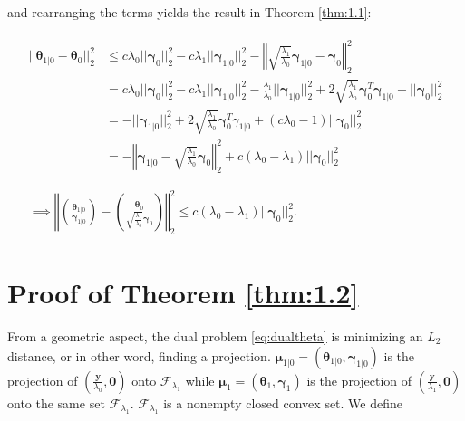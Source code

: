 and rearranging the terms yields the result in Theorem \ref{thm:1.1}:

\begin{gather}
    \begin{aligned}
        ||\boldsymbol\theta_{1|0}-\boldsymbol\theta_{0}||_2^2&\leq c\lambda_0||\boldsymbol\gamma_{0}||_2^2-c\lambda_1||\boldsymbol\gamma_{1|0}||_2^2-\left\Vert\sqrt{\frac{\lambda_1}{\lambda_0}}\boldsymbol\gamma_{1|0}-\boldsymbol\gamma_{0}\right\Vert_2^2\\
        &=c\lambda_0||\boldsymbol\gamma_{0}||_2^2-c\lambda_1||\boldsymbol\gamma_{1|0}||_2^2-\frac{\lambda_1}{\lambda_0}||\boldsymbol\gamma_{1|0}||_2^2+2\sqrt{\frac{\lambda_1}{\lambda_0}}\boldsymbol\gamma_{0}^T\boldsymbol\gamma_{1|0}-||\boldsymbol\gamma_{0}||_2^2\\
        &=-||\boldsymbol\gamma_{1|0}||_2^2+2\sqrt{\frac{\lambda_1}{\lambda_0}}\boldsymbol\gamma_{0}^T\gamma_{1|0}+(c\lambda_0-1)||\boldsymbol\gamma_{0}||_2^2\\
        &=-\left\Vert\boldsymbol\gamma_{1|0}-\sqrt{\frac{\lambda_1}{\lambda_0}}\boldsymbol\gamma_{0}\right\Vert_2^2+c(\lambda_0-\lambda_1)||\boldsymbol\gamma_{0}||_2^2\\
    \end{aligned}\\
    \begin{aligned}
        \implies \left\Vert\binom{\boldsymbol\theta_{1|0}}{\boldsymbol\gamma_{1|0}}-\binom{\boldsymbol\theta_{0}}{\sqrt{\frac{\lambda_1}{\lambda_0}}\boldsymbol\gamma_{0}}\right\Vert_2^2\leq c(\lambda_0-\lambda_1)||\boldsymbol\gamma_{0}||_2^2.\nonumber
    \end{aligned}
\end{gather}

\section{Proof of Theorem \ref{thm:1.2}}

From a geometric aspect, the dual problem \eqref{eq:dualtheta} is minimizing an $L_2$ distance, or in other word, finding a projection. $\boldsymbol\mu_{1|0}=(\boldsymbol \theta_{1|0},\boldsymbol \gamma_{1|0})$ is the projection of $(\frac{\boldsymbol y}{\lambda_0},\boldsymbol0)$ onto $\mathcal{F}_{\lambda_1}$ while $\boldsymbol\mu_1=(\boldsymbol \theta_{1},\boldsymbol \gamma_{1})$ is the projection of $(\frac{\boldsymbol y}{\lambda_1},\boldsymbol0)$ onto the same set $\mathcal{F}_{\lambda_1}$. $\mathcal{F}_{\lambda_1}$ is a nonempty closed convex set. We define

